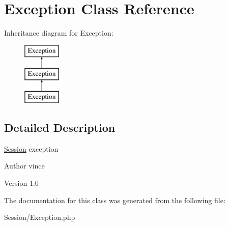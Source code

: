\hypertarget{class_anemo_1_1_session_1_1_exception}{
\section{Exception Class Reference}
\label{class_anemo_1_1_session_1_1_exception}
}
Inheritance diagram for Exception:\begin{figure}[H]
\begin{center}
\leavevmode
\includegraphics[height=3.000000cm]{class_anemo_1_1_session_1_1_exception}
\end{center}
\end{figure}


\subsection{Detailed Description}
\hyperlink{class_anemo_1_1_session}{Session} exception \begin{DoxyAuthor}{Author}
vince 
\end{DoxyAuthor}
\begin{DoxyVersion}{Version}
1.0 
\end{DoxyVersion}


The documentation for this class was generated from the following file:\begin{DoxyCompactItemize}
\item 
Session/Exception.php\end{DoxyCompactItemize}
